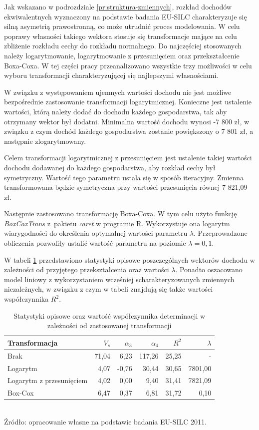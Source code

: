 Jak wskazano w podrozdziale \ref{pr:struktura-zmiennych}, rozkład dochodów ekwiwalentnych wyznaczony na podstawie badania EU-SILC charakteryzuje się silną asymetrią prawostronną, co może utrudnić proces modelowania. W celu poprawy własności takiego wektora stosuje się transformacje mające na celu zbliżenie rozkładu cechy do rozkładu normalnego. Do najczęściej stosowanych należy logarytmowanie, logarytmowanie z przesunięciem oraz przekształcenie Boxa-Coxa. W tej części pracy przeanalizowano wszystkie trzy możliwości w celu wyboru transformacji charakteryzującej się najlepszymi własnościami. 

W związku z występowaniem ujemnych wartości dochodu nie jest możliwe bezpośrednie zastosowanie transformacji logarytmicznej. Konieczne jest ustalenie wartości, którą należy dodać do dochodu każdego gospodarstwa, tak aby otrzymany wektor był dodatni. Minimalna wartość dochodu wynosi -7 800 zł, w związku z czym dochód każdego gospodarstwa zostanie powiększony o 7 801 zł, a następnie zlogarytmowany.

Celem transformacji logarytmicznej z przesunięciem jest ustalenie takiej wartości dochodu dodawanej do każdego gospodarstwa, aby rozkład cechy był symetryczny. Wartość tego parametru ustala się w sposób iteracyjny. Zmienna transformowana będzie symetryczna przy wartości przesunięcia równej 7 821,09 zł.

Następnie zastosowano transformację Boxa-Coxa. W tym celu użyto funkcję \emph{BoxCoxTrans} z~pakietu \emph{caret} \citep{caret2016} w programie R. Wykorzystuje ona logarytm wiarygodności do określenia optymalnej wartości parametru $\lambda$. Przeprowadzone obliczenia pozwoliły ustalić wartość parametru na poziomie $\lambda=0,1$.

W tabeli \ref{tab:trans} przedstawiono statystyki opisowe poszczególnych wektorów dochodu w zależności od przyjętego przekształcenia oraz wartości $\lambda$. Ponadto oszacowano model liniowy z wykorzystaniem wcześniej scharakteryzowanych zmiennych niezależnych, w związku z czym w tabeli znajdują się także wartości współczynnika $R^2$.

\begin{table}[htp]
\caption{Statystyki opisowe oraz wartość współczynnika determinacji w zależności od zastosowanej transformacji}
\label{tab:trans}
\centering
\begin{tabular}{lrrrrr}
\hline
Transformacja & $V_s$ & $\alpha_3$ & $\alpha_4$ & $R^2$ & $\lambda$\tabularnewline
\hline
Brak & 71,04 & 6,23 & 117,26 & 25,25 & - \tabularnewline
Logarytm & 4,07 & -0,76 & 30,44 & 30,65 & 7801,00 \tabularnewline
Logarytm z przesunięciem & 4,02 & 0,00 & 9,40 & 31,41 & 7821,09 \tabularnewline
Box-Cox & 6,47 & 0,37 & 6,81 & 31,72 & 0,10 \tabularnewline
\hline
\end{tabular}\\
\small{Źródło: opracowanie własne na podstawie badania EU-SILC 2011.}
\end{table}

